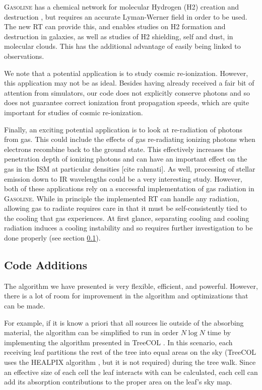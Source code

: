 \textsc{Gasoline} has a chemical network for molecular Hydrogen (H2) creation and destruction \citep{christensenEt12}, but requires an accurate Lyman-Werner field in order to be used. The new RT can provide this, and enables studies on H2 formation and destruction in galaxies, as well as studies of H2 shielding, self and dust, in molecular clouds. This has the additional advantage of easily being linked to observations.

We note that a potential application is to study cosmic re-ionization. However, this application may not be as ideal. Besides having already received a fair bit of attention from simulators, our code does not explicitly conserve photons and so does not guarantee correct ionization front propagation speeds, which are quite important for studies of cosmic re-ionization.

Finally, an exciting potential application is to look at re-radiation of photons from gas. This could include the effects of gas re-radiating ionizing photons when electrons recombine back to the ground state. This effectively increases the penetration depth of ionizing photons and can have an important effect on the gas in the ISM at particular densities [cite rahmati]. As well, processing of stellar emission down to IR wavelengths could be a very interesting study. However, both of these applications rely on a successful implementation of gas radiation in \textsc{Gasoline}. While in principle the implemented RT can handle any radiation, allowing gas to radiate requires care in that it must be self-consistently tied to the cooling that gas experiences. At first glance, separating cooling and cooling radiation induces a cooling instability and so requires further investigation to be done properly (see section \ref{sec:codeadditions}).

\subsection{Code Additions}
\label{sec:codeadditions}

The algorithm we have presented is very flexible, efficient, and powerful. However, there is a lot of room for improvement in the algorithm and optimizations that can be made.

For example, if it is know a priori that all sources lie outside of the absorbing material, the algorithm can be simplified to run in order $N\log{N}$ time by implementing the algorithm presented in TreeCOL \citep{clarkEt12}. In this scenario, each receiving leaf partitions the rest of the tree into equal areas on the sky (TreeCOL uses the HEALPIX algorithm \citep{gorskiEt05}, but it is not required) during the tree walk. Since an effective size of each cell the leaf interacts with can be calculated, each cell can add its absorption contributions to the proper area on the leaf's sky map.

